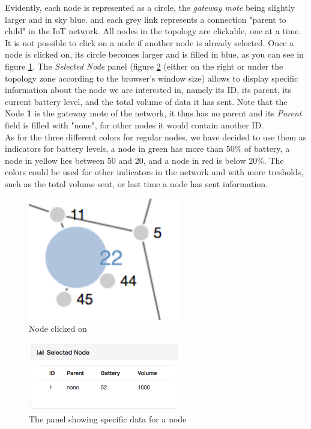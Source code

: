Evidently, each node is represented as a circle, the \textit{gateway mote} being slightly larger and in sky blue. and each grey link represents a connection "parent to child" in the IoT network. All nodes in the topology are clickable, one at a time. It is not possible to click on a node if another node is already selected. Once a node is clicked on, its circle becomes larger and is filled in blue, as you can see in figure \ref{fig:snodeblue}. The \textit{Selected Node} panel (figure \ref{fig:snode} (either on the right or under the topology zone according to the browser's window size) allows to display specific information about the node we are interested in, namely its ID, its parent, its current battery level, and the total volume of data it has sent. Note that the Node \textbf{1} is the gateway mote of the network, it thus has no parent and its \textit{Parent} field is filled with "none", for other nodes it would contain another ID.\\

As for the three different colors for regular nodes, we have decided to use them as indicators for battery levels, a node in green has more than 50\% of battery, a node in yellow lies between 50 and 20, and a node in red is below 20\%. The colors could be used for other indicators in the network and with more tresholds, such as the total volume sent, or last time a node has sent information.\\

\begin{figure}[!h]
	\centering
	\includegraphics[width=0.6\textwidth]{res/snodeblue.png}
	\caption{Node clicked on}
	\label{fig:snodeblue}
\end{figure}


\begin{figure}[!h]
	\centering
	\includegraphics[width=0.6\textwidth]{res/snode.png}
	\caption{The panel showing specific data for a node}
	\label{fig:snode}
\end{figure}



